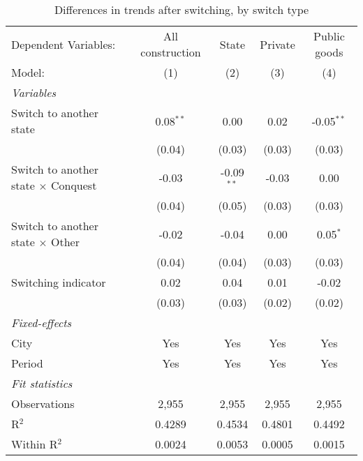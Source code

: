 \begin{table}[htbp]
   \caption{\label{tab:baseline_100y} Differences in trends after switching, by switch type}
   \centering
   \begin{tabular}{lcccc}
      \tabularnewline \midrule \midrule
      Dependent Variables:                       & All construction & State        & Private & Public goods\\  
      Model:                                     & (1)              & (2)          & (3)     & (4)\\  
      \midrule
      \emph{Variables}\\
      Switch to another state                    & 0.08$^{**}$      & 0.00         & 0.02    & -0.05$^{**}$\\   
                                                 & (0.04)           & (0.03)       & (0.03)  & (0.03)\\   
      Switch to another state $\times$ Conquest  & -0.03            & -0.09$^{**}$ & -0.03   & 0.00\\   
                                                 & (0.04)           & (0.05)       & (0.03)  & (0.03)\\   
      Switch to another state $\times$ Other     & -0.02            & -0.04        & 0.00    & 0.05$^{*}$\\   
                                                 & (0.04)           & (0.04)       & (0.03)  & (0.03)\\   
      Switching indicator                        & 0.02             & 0.04         & 0.01    & -0.02\\   
                                                 & (0.03)           & (0.03)       & (0.02)  & (0.02)\\   
      \midrule
      \emph{Fixed-effects}\\
      City                                       & Yes              & Yes          & Yes     & Yes\\  
      Period                                     & Yes              & Yes          & Yes     & Yes\\  
      \midrule
      \emph{Fit statistics}\\
      Observations                               & 2,955            & 2,955        & 2,955   & 2,955\\  
      R$^2$                                      & 0.4289           & 0.4534       & 0.4801  & 0.4492\\  
      Within R$^2$                               & 0.0024           & 0.0053       & 0.0005  & 0.0015\\  
      \midrule \midrule
      

\end{tabular}
\end{table}
